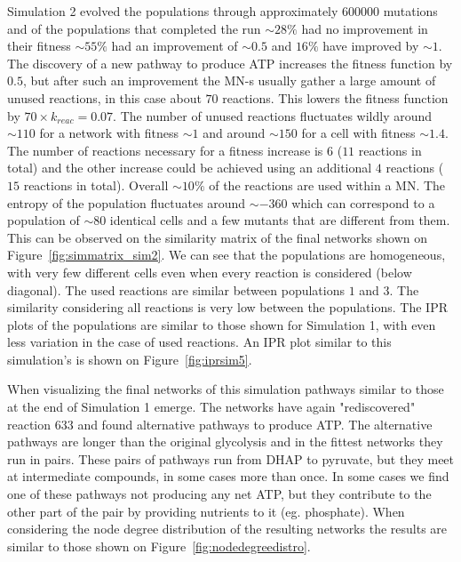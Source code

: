\documentclass[a4paper,12pt]{article}
\begin{document}
Simulation 2 evolved the populations through approximately $600 000$ mutations and of the populations that completed the run $\sim 28 \%$ had no improvement in their fitness $\sim 55 \%$ had an improvement of $\sim 0.5$ and $16 \%$ have improved by $\sim 1$. The discovery of a new pathway to produce ATP increases the fitness function by $0.5$, but after such an improvement the MN-s usually gather a large amount of unused reactions, in this case about $70$ reactions. This lowers the fitness function by $70\times k_{reac}=0.07$. The number of unused reactions fluctuates wildly around $\sim 110$ for a network with fitness $\sim 1$ and around $\sim 150$ for a cell with fitness $\sim 1.4$. The number of reactions necessary for a fitness increase is $6$ ($11$ reactions in total) and the other increase could be achieved using an additional $4$ reactions ($15$ reactions in total). Overall $\sim 10\%$ of the reactions are used within a MN. The entropy of the population fluctuates around $\sim -360$ which can correspond to a population of $\sim 80$ identical cells and a few mutants that are different from them. This can be observed on the similarity matrix of the final networks shown on Figure~\ref{fig:simmatrix_sim2}. We can see that the populations are homogeneous, with very few different cells even when every reaction is considered (below diagonal). The used reactions are similar between populations $1$ and $3$. The similarity considering all reactions is very low between the populations. 
The IPR plots of the populations are similar to those shown for Simulation 1, with even less variation in the case of used reactions. An IPR plot similar to this simulation's is shown on Figure~\ref{fig:iprsim5}. 

When visualizing the final networks of this simulation pathways similar to those at the end of Simulation 1 emerge. The networks have again "rediscovered" reaction $633$ and found alternative pathways to produce ATP. The alternative pathways are longer than the original glycolysis and in the fittest networks they run in pairs. These pairs of pathways run from DHAP to pyruvate, but they meet at intermediate compounds, in some cases more than once. In some cases we find one of these pathways not producing any net ATP, but they contribute to the other part of the pair by providing nutrients to it (eg. phosphate). When considering the node degree distribution of the resulting networks the results are similar to those shown on Figure~\ref{fig:nodedegreedistro}. 
\end{document}
